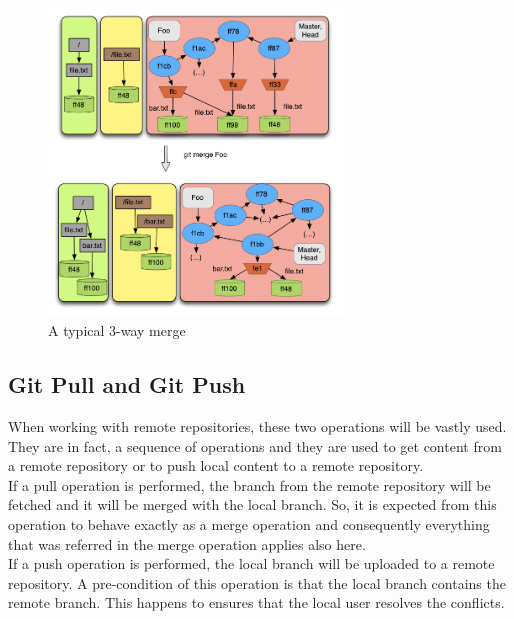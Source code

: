 \begin{figure}[htp]
   \centering
   \includegraphics[width=0.7\textwidth]{images/merge3way}
   \caption{A typical 3-way merge}\label{fig:merge3way}
\end{figure}

\newpage
\subsection{Git Pull and Git Push}

When working with remote repositories, these two operations will be vastly
used. They are in fact, a sequence of operations and they are used to get content
from a remote repository or to push local content to a remote repository.\\

If a pull operation is performed, the branch from the remote repository will be fetched
and it will be merged with the local branch. So, it is expected from
this operation to behave exactly as a merge operation and consequently
everything that was referred in the merge operation applies also here. \\

If a push operation is performed, the local branch will be uploaded to
a remote repository. A pre-condition of this operation is that the
local branch contains the remote branch. This happens to ensures that
the local user resolves the conflicts.
